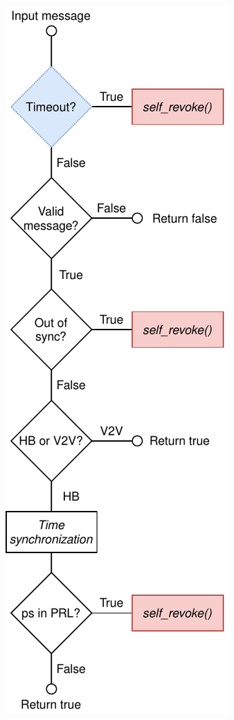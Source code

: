 \begin{figure}
\begin{subfigure}[T]{.4\columnwidth}
    \end{subfigure}
    \unskip\ \vrule\
    \begin{subfigure}[T]{.4\columnwidth}
        \includegraphics[width=\columnwidth]{figures/drawio/flowchart-process.drawio.pdf}

\end{subfigure}
\end{figure}
